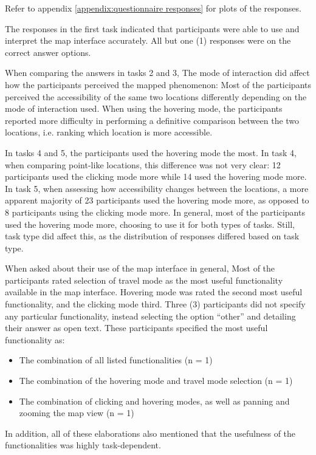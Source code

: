 Refer to appendix \ref{appendix:questionnaire responses} for plots of the responses.

The responses in the first task indicated that participants were
able to use and interpret the map interface accurately.
All but one (1) responses
were on the correct answer options.

When comparing the answers in tasks 2 and 3,
The mode of interaction did affect how the participants perceived the mapped phenomenon:
Most of the participants perceived
the accessibility of the same two locations
differently depending on the mode of interaction used.
When using the hovering mode, the participants reported more difficulty in
performing a definitive comparison between the two locations,
i.e. ranking which location is more accessible.

In tasks 4 and 5,
the participants used the hovering mode the most.
In task 4, when comparing point-like locations,
this difference was not very clear:
12 participants used the clicking mode more while 14 used the hovering mode more.
In task 5, when assessing how accessibility changes between the locations,
a more apparent majority of 23 participants used the hovering mode more,
as opposed to 8 participants using the clicking mode more.
In general,
most of the participants used the hovering mode more,
choosing to use it for both types of tasks.
Still,
task type did affect this,
as the distribution of responses differed based on task type.

When asked about their use of the map interface in general,
Most of the participants rated selection of travel mode as
the most useful functionality available in the map interface.
Hovering mode was rated the second most useful functionality,
and the clicking mode third.
Three (3) participants did not specify any particular functionality,
instead selecting the option \enquote{other}
and detailing their answer as open text.
These participants specified the most useful functionality as:
\begin{itemize}
	\item The combination of all listed functionalities (n = 1)
	\item The combination of the hovering mode and travel mode selection (n = 1)
	\item The combination of clicking and hovering modes, as well as panning and zooming the map view (n = 1)
\end{itemize}
In addition,
all of these elaborations also mentioned
that the usefulness of the functionalities was highly task-dependent.

